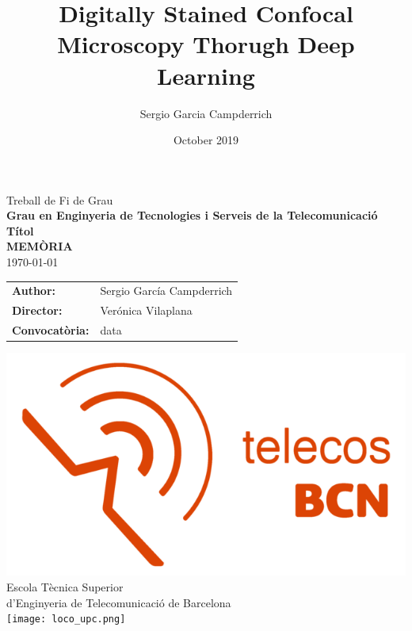 \documentclass[a4paper,12pt,titlepage,twoside]{article}
\title{Digitally Stained Confocal Microscopy Thorugh Deep Learning}
\author{Sergio Garcia Campderrich}
\date{October 2019}
\begin{document}
\renewcommand{\refname}{Bibliografia}
\begin{titlepage}
    {\centering
    {\Huge Treball de Fi de Grau}\\
    \vspace{5mm}
    {\Large \textbf{Grau en Enginyeria de Tecnologies i Serveis de la Telecomunicació}}\\
    \vspace{20mm}
    \Huge \textbf{Títol}\\
    \vspace{10mm}
    \Huge\textbf{MEMÒRIA}\\
    \vspace{3mm}
    \Large\today\\  %
    }
    \vspace{20mm}
    \hspace{2mm}
    \begin{tabular}{l@{ } l}
        \vspace{5mm}
        \Large \textbf{Author:} & \Large{Sergio García Campderrich} \\
        \vspace{5mm}
        \Large\textbf{Director:} & \Large{Verónica Vilaplana}\\

         \Large\textbf{Convocatòria: } & \Large{data}\\
    \end{tabular}\par
    \vspace{10mm}
    {\centering
    \includegraphics[scale=0.3]{logo_telecos_2018.png}\\
    {\Large Escola Tècnica Superior \\ d'Enginyeria de Telecomunicació de Barcelona}\\
    \vspace{3mm}
    \texttt{[image: loco\_upc.png]}
    \par
    }
\end{titlepage}
\end{document}
